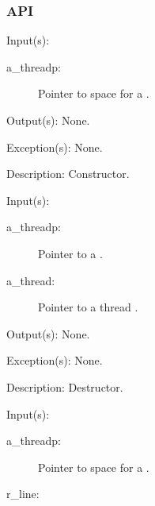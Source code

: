 \subsubsection{API}
\begin{capi}
\label{nxo_threadp_new}
	\begin{capilist}
	\item[Input(s): ]
		\begin{description}\item[]
		\item[a\_threadp: ]
			Pointer to space for a .
		\end{description}
	\item[Output(s): ] None.
	\item[Exception(s): ] None.
	\item[Description: ]
		Constructor.
	\end{capilist}
\label{nxo_threadp_delete}
	\begin{capilist}
	\item[Input(s): ]
		\begin{description}\item[]
		\item[a\_threadp: ]
			Pointer to a \classname{threadp}.
		\item[a\_thread: ]
			Pointer to a thread \classname{nxo}.
		\end{description}
	\item[Output(s): ] None.
	\item[Exception(s): ] None.
	\item[Description: ]
		Destructor.
	\end{capilist}
\label{nxo_threadp_position_get}
	\begin{capilist}
	\item[Input(s): ]
		\begin{description}\item[]
		\item[a\_threadp: ]
			Pointer to space for a .
		\item[r\_line: ]

\end{description}
\end{capilist}
\end{capi}
